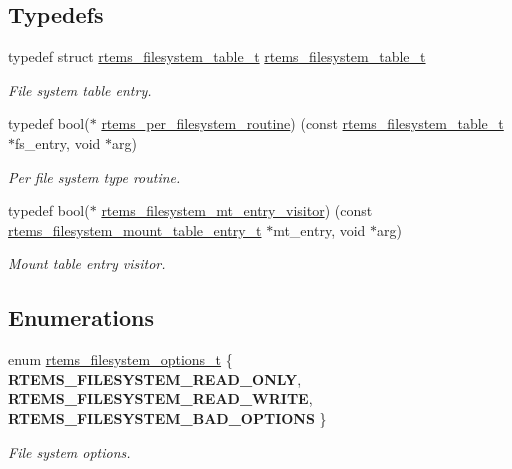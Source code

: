 \subsection*{Typedefs}
\begin{DoxyCompactItemize}
\item 
\mbox{\label{group__FileSystemTypesAndMount_ga7a76c11a7070c975aba1d545f6b7df07}} 
typedef struct \mbox{\hyperlink{structrtems__filesystem__table__t}{rtems\+\_\+filesystem\+\_\+table\+\_\+t}} \mbox{\hyperlink{group__FileSystemTypesAndMount_ga7a76c11a7070c975aba1d545f6b7df07}{rtems\+\_\+filesystem\+\_\+table\+\_\+t}}
\begin{DoxyCompactList}\small\item\em File system table entry. \end{DoxyCompactList}\item 
typedef bool($\ast$ \mbox{\hyperlink{group__FileSystemTypesAndMount_gaa40c0b8e4e5abe60a08bead5b3c72241}{rtems\+\_\+per\+\_\+filesystem\+\_\+routine}}) (const \mbox{\hyperlink{structrtems__filesystem__table__t}{rtems\+\_\+filesystem\+\_\+table\+\_\+t}} $\ast$fs\+\_\+entry, void $\ast$arg)
\begin{DoxyCompactList}\small\item\em Per file system type routine. \end{DoxyCompactList}\item 
typedef bool($\ast$ \mbox{\hyperlink{group__FileSystemTypesAndMount_ga84a7a5cd36614b906e1c485224beb686}{rtems\+\_\+filesystem\+\_\+mt\+\_\+entry\+\_\+visitor}}) (const \mbox{\hyperlink{structrtems__filesystem__mount__table__entry__tt}{rtems\+\_\+filesystem\+\_\+mount\+\_\+table\+\_\+entry\+\_\+t}} $\ast$mt\+\_\+entry, void $\ast$arg)
\begin{DoxyCompactList}\small\item\em Mount table entry visitor. \end{DoxyCompactList}\end{DoxyCompactItemize}
\subsection*{Enumerations}
\begin{DoxyCompactItemize}
\item 
\mbox{\label{group__FileSystemTypesAndMount_gabb3a23ee6b6e7aacb719a1a81716af7a}} 
enum \mbox{\hyperlink{group__FileSystemTypesAndMount_gabb3a23ee6b6e7aacb719a1a81716af7a}{rtems\+\_\+filesystem\+\_\+options\+\_\+t}} \{ {\bfseries R\+T\+E\+M\+S\+\_\+\+F\+I\+L\+E\+S\+Y\+S\+T\+E\+M\+\_\+\+R\+E\+A\+D\+\_\+\+O\+N\+LY}, 
{\bfseries R\+T\+E\+M\+S\+\_\+\+F\+I\+L\+E\+S\+Y\+S\+T\+E\+M\+\_\+\+R\+E\+A\+D\+\_\+\+W\+R\+I\+TE}, 
{\bfseries R\+T\+E\+M\+S\+\_\+\+F\+I\+L\+E\+S\+Y\+S\+T\+E\+M\+\_\+\+B\+A\+D\+\_\+\+O\+P\+T\+I\+O\+NS}
 \}
\begin{DoxyCompactList}\small\item\em File system options. \end{DoxyCompactList}\end{DoxyCompactItemize}
